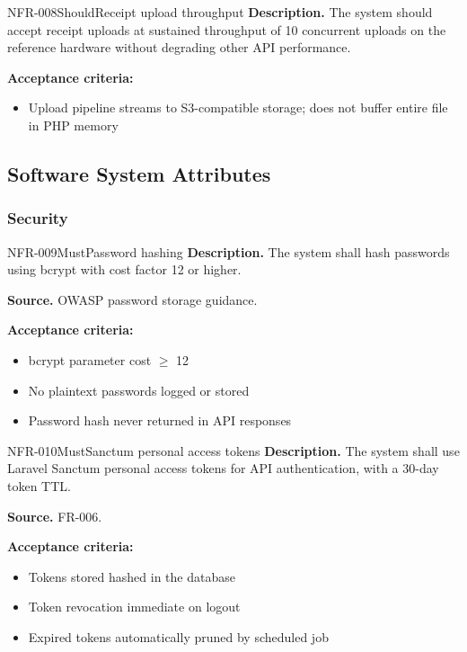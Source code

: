 \documentclass[11pt,a4paper]{article}
\begin{document}
\begin{requirement}{NFR-008}{Should}{Receipt upload throughput}
\textbf{Description.} The system should accept receipt uploads at sustained throughput of 10 concurrent uploads on the reference hardware without degrading other API performance.

\textbf{Acceptance criteria:}
\begin{itemize}
    \item Upload pipeline streams to S3-compatible storage; does not buffer entire file in PHP memory
\end{itemize}
\end{requirement}

\subsection{Software System Attributes}

\subsubsection{Security}

\begin{requirement}{NFR-009}{Must}{Password hashing}
\textbf{Description.} The system shall hash passwords using bcrypt with cost factor 12 or higher.

\textbf{Source.} OWASP password storage guidance.

\textbf{Acceptance criteria:}
\begin{itemize}
    \item bcrypt parameter cost $\geq$ 12
    \item No plaintext passwords logged or stored
    \item Password hash never returned in API responses
\end{itemize}
\end{requirement}

\begin{requirement}{NFR-010}{Must}{Sanctum personal access tokens}
\textbf{Description.} The system shall use Laravel Sanctum personal access tokens for API authentication, with a 30-day token TTL.

\textbf{Source.} FR-006.

\textbf{Acceptance criteria:}
\begin{itemize}
    \item Tokens stored hashed in the database
    \item Token revocation immediate on logout
    \item Expired tokens automatically pruned by scheduled job
\end{itemize}
\end{requirement}
\end{document}
